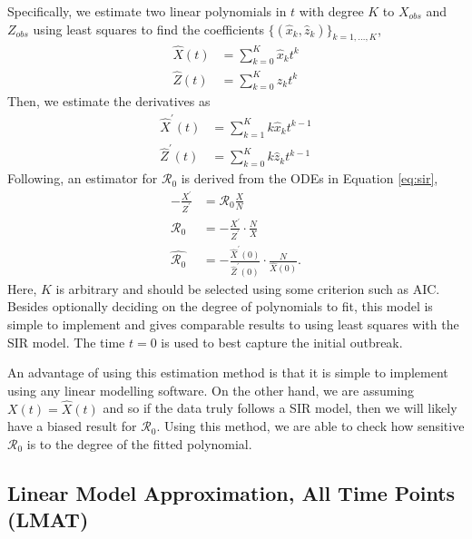 \message{ !name(draft_v13.tex)}\documentclass[12pt]{article}
\newcommand{\rr}{\ensuremath{\mathcal{R}_0}}
\begin{document}
Specifically, we estimate two linear polynomials in \(t\) with degree $K$  to \(X_{obs}\)
and \(Z_{obs}\) using least squares to find the coefficients $\{(\hat{x}_k,
\hat{z}_k)\}_{k=1, \dots, K}$,
\begin{align*}
\hat{X}(t) &= \sum_{k=0}^K \hat{x}_k t^k\\
{\hat{Z}}(t) &= \sum_{k=0}^K \hat{z}_k t^k
\end{align*}
Then, we estimate the derivatives as
\begin{align*}
\hat{X}^\prime(t) &= \sum_{k=1}^K k \hat{x}_k t^{k-1}\\
\hat{Z}^\prime(t) &= \sum_{k=0}^K k \hat{z}_k t^{k-1}
\end{align*}
Following,  an estimator for \(\rr\) is derived from the ODEs in Equation \eqref{eq:sir},
\begin{align}
  - \frac{X^\prime}{Z^\prime}&= \rr \frac{X}{N} \nonumber\\
  \rr &=       -\frac{X^\prime}{
        Z^\prime} \cdot \frac{N}{X} \nonumber\\
  \hat{\rr} &= -\frac{\hat{X}^\prime(0)}{ \hat{Z}^\prime(0)} \cdot \frac{N}{\hat{X}(0)}. \nonumber
  \end{align}
  Here, $K$ is arbitrary and should be selected using some criterion such as AIC.  Besides optionally deciding on the degree of polynomials to fit, this model is simple to implement and gives comparable results to using least squares with the SIR model.  The time $t=0$ is used to best capture the initial outbreak.

  An advantage of using this estimation method is that it is simple to implement using any linear modelling software.  On the other hand, we are assuming $X(t) = \hat{X}(t)$ and so if the data truly follows a SIR model, then we will likely have a biased result for $\rr$.  Using this method, we are able to check how sensitive $\rr$ is to the degree of the fitted polynomial.

\subsection{Linear Model Approximation, All Time Points (LMAT)}\label{linear-model-approximation-all-time-points-degree-10}
\end{document}
